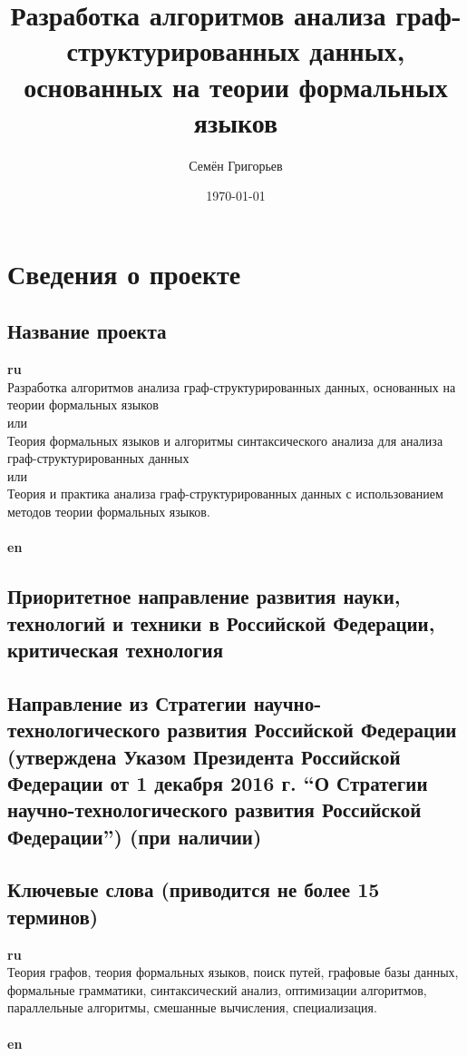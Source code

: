 \documentclass[12pt]{article}  %
\title{Разработка алгоритмов анализа граф-структурированных данных, основанных на теории формальных языков}
\author{Семён Григорьев}
\date{\today}
\theoremstyle{remark}
\begin{document}

\maketitle

\section{Сведения о проекте}

\subsection{Название проекта}

\textbf{ru}\\
%
Разработка алгоритмов анализа граф-структурированных данных, основанных на теории формальных языков
\\
или
\\
Теория формальных языков и алгоритмы синтаксического анализа для анализа граф-структурированных данных
\\
или
\\
Теория и практика анализа граф-структурированных данных с использованием методов теории формальных языков.
\\
\\
\textbf{en}\\


\subsection{Приоритетное направление развития науки, технологий и техники в Российской Федерации, критическая технология}
%


\subsection{Направление из Стратегии научно-технологического развития Российской Федерации (утверждена Указом Президента Российской Федерации от 1 декабря 2016 г.  ``О Стратегии научно-технологического развития Российской Федерации'') (при наличии)}
%

\subsection{Ключевые слова (приводится не более 15 терминов)}

\textbf{ru}\\
%
Теория графов, теория формальных языков, поиск путей, графовые базы данных, формальные грамматики, синтаксический анализ, оптимизации алгоритмов, параллельные алгоритмы, смешанные вычисления, специализация.
\\
\\
\textbf{en}\\
\end{document}
